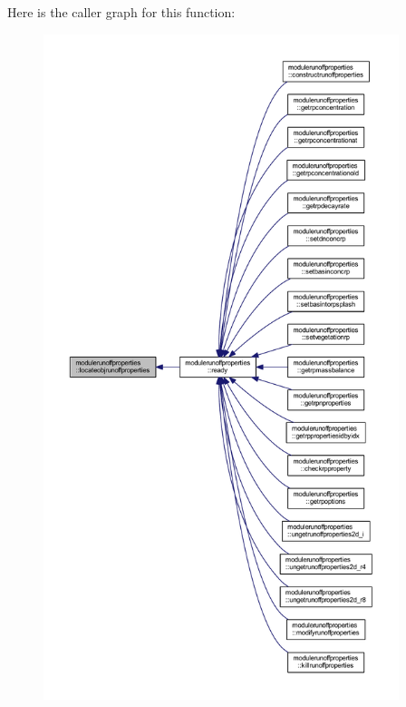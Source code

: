 Here is the caller graph for this function\+:\nopagebreak
\begin{figure}[H]
\begin{center}
\leavevmode
\includegraphics[height=550pt]{namespacemodulerunoffproperties_adf7480277becbdd9d386b2941df91200_icgraph}
\end{center}
\end{figure}
\mbox{\label{namespacemodulerunoffproperties_a951d85579cdd397fac47bf26d3aac4cb}} 
